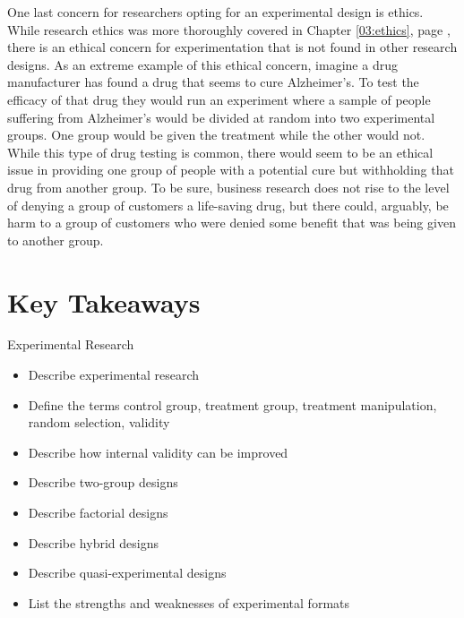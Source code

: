 One last concern for researchers opting for an experimental design is ethics. While research ethics was more thoroughly covered in Chapter \ref{03:ethics}, page \pageref{03:ethics}, there is an ethical concern for experimentation that is not found in other research designs. As an extreme example of this ethical concern, imagine a drug manufacturer has found a drug that seems to cure Alzheimer's. To test the efficacy of that drug they would run an experiment where a sample of people suffering from Alzheimer's would be divided at random into two experimental groups. One group would be given the treatment while the other would not. While this type of drug testing is common, there would seem to be an ethical issue in providing one group of people with a potential cure but withholding that drug from another group. To be sure, business research does not rise to the level of denying a group of customers a life-saving drug, but there could, arguably, be harm to a group of customers who were denied some benefit that was being given to another group.

\section{Key Takeaways}\label{ch09:summary}

\begin{center}
	\begin{tkawybox}{Experimental Research}
		\begin{itemize}
			\setlength{\itemsep}{0pt}
			\setlength{\parskip}{0pt}
			\setlength{\parsep}{0pt}
			
			\item Describe experimental research
			\item Define the terms control group, treatment group, treatment manipulation, random selection, validity
			\item Describe how internal validity can be improved
			\item Describe two-group designs
			\item Describe factorial designs
			\item Describe hybrid designs
			\item Describe quasi-experimental designs
			\item List the strengths and weaknesses of experimental formats
			
		\end{itemize}
	\end{tkawybox}
\end{center}
